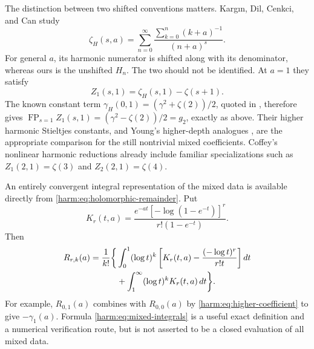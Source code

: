 The distinction between two shifted conventions matters.  Karg\i n,
Dil, Cenkci, and Can \cite{harm:Kargin2023} study
\[
 \zeta_H(s,a)=\sum_{n=0}^{\infty}
       \frac{\sum_{k=0}^{n}(k+a)^{-1}}{(n+a)^s}.
\]
For general $a$, its harmonic numerator is shifted along with its
denominator, whereas ours is the unshifted $H_n$.  The two should not be
identified.  At $a=1$ they satisfy
\begin{equation}\label{harm:eq:harmonic-literature-comparison}
 Z_1(s,1)=\zeta_H(s,1)-\zeta(s+1).
\end{equation}
The known constant term
$\gamma_H(0,1)=(\gamma^2+\zeta(2))/2$, quoted in
\cite{harm:Kargin2023}, therefore gives
$\operatorname{FP}_{s=1}Z_1(s,1)=(\gamma^2-\zeta(2))/2=g_2$,
exactly as above.  Their higher harmonic Stieltjes constants, and
Young's higher-depth analogues \cite{harm:Young2023,harm:Young2024},
are the appropriate comparison for the still nontrivial mixed
coefficients.  Coffey's nonlinear harmonic reductions
\cite{harm:Coffey2011} already include familiar specializations such as
$Z_1(2,1)=\zeta(3)$ and $Z_2(2,1)=\zeta(4)$.

An entirely convergent integral representation of the mixed data is
available directly from \eqref{harm:eq:holomorphic-remainder}.  Put
\[
 K_r(t,a)=\frac{e^{-at}[-\log(1-e^{-t})]^r}
                  {r!(1-e^{-t})}.
\]
Then
\begin{align}\label{harm:eq:mixed-integrals}
 R_{r,k}(a)=\frac1{k!}\bigg\{
 &\int_0^1(\log t)^k
   \left[K_r(t,a)-\frac{(-\log t)^r}{r!t}\right]dt\notag\\
 &+\int_1^\infty(\log t)^kK_r(t,a)\,dt\bigg\}.
\end{align}
For example, $R_{0,1}(a)$ combines with $R_{0,0}(a)$ by
\eqref{harm:eq:higher-coefficient} to give $-\gamma_1(a)$.  Formula
\eqref{harm:eq:mixed-integrals} is a useful exact definition and a
numerical verification route, but is not asserted to be a closed
evaluation of all mixed data.

